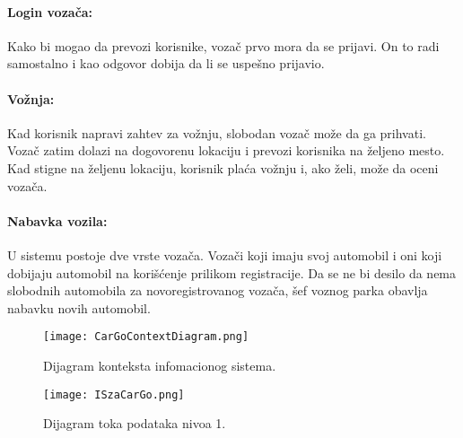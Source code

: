 \paragraph{Login vozača:}
    Kako bi mogao da prevozi korisnike, vozač prvo mora da se prijavi. On to radi samostalno i kao odgovor dobija da li se uspešno prijavio.
\paragraph{Vožnja:}
    Kad korisnik napravi zahtev za vožnju, slobodan vozač može da ga prihvati. Vozač zatim dolazi na dogovorenu lokaciju i prevozi korisnika na željeno mesto. Kad stigne na željenu lokaciju, korisnik plaća vožnju i, ako želi, može da oceni vozača.
\paragraph{Nabavka vozila:}
    U sistemu postoje dve vrste vozača. Vozači koji imaju svoj automobil i oni koji dobijaju automobil na korišćenje prilikom registracije. Da se ne bi desilo da nema slobodnih automobila za novoregistrovanog vozača, šef voznog parka obavlja nabavku novih automobil.

\begin{figure}[H]
\begin{center}
\texttt{[image: CarGoContextDiagram.png]}
\end{center}
    \caption{Dijagram konteksta infomacionog sistema.}
\label{fig:CarGoContextDiagram}
\end{figure}

\begin{figure}[H]
\begin{center}
\texttt{[image: ISzaCarGo.png]}
\end{center}
    \caption{Dijagram toka podataka nivoa 1.}
\label{fig:dtp1}
\end{figure}

